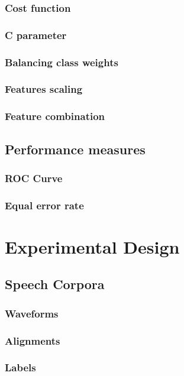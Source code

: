 \documentclass[11pt,a4paper]{tesis}
\begin{document}
		\subsection{Cost function}
			
		\subsection{C parameter}
			
		\subsection{Balancing class weights}
			
		\subsection{Features scaling}
			
		\subsection{Feature combination}
			
	\section{Performance measures}
		\subsection{ROC Curve}
			
		\subsection{Equal error rate}
			
\chapter{Experimental Design}
	\section{Speech Corpora}
		\subsection{Waveforms}
		\subsection{Alignments}
		\subsection{Labels}
\end{document}
